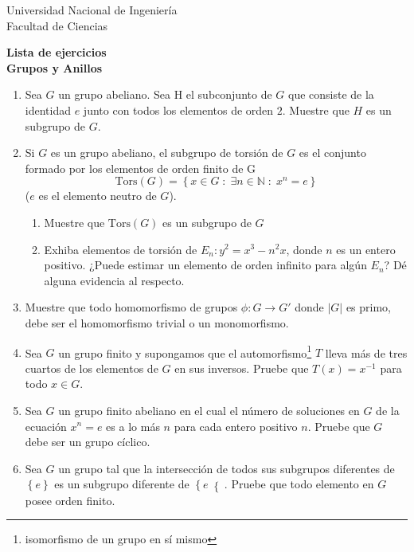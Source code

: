 \documentclass[12pt]{report}
\begin{document}
\begin{flushleft}
Universidad Nacional de Ingenier\'ia\\Facultad de Ciencias\\ \vspace{1cm}
\end{flushleft}
\begin{center}
\textbf{\Large{Lista de ejercicios\\ Grupos y Anillos}}
\end{center}
\begin{enumerate}
\item Sea $G$ un grupo abeliano. Sea H el subconjunto de $G$ que consiste de la identidad $e$ junto con todos los elementos de orden $2$. Muestre que $H$ es un subgrupo de $G$.
\item Si $G$ es un grupo abeliano, el subgrupo de torsi\'on de $G$ es el conjunto formado por los elementos de orden finito de G $$\text{Tors}(G)=\left\lbrace x\in G\;:\;\exists n\in\mathbb{N}\;:\; x^n=e\right\rbrace$$ 
($e$ es el elemento neutro de $G$).
\begin{enumerate}
\item Muestre que $\text{Tors}(G)$ es un subgrupo de $G$
\item Exhiba elementos de torsi\'on de $E_n:y^2=x^3-n^2x$, donde $n$ es un entero positivo. ¿Puede estimar un elemento de orden infinito para alg\'un $E_n$? D\'e alguna evidencia al respecto.
\end{enumerate}
\item Muestre que todo homomorfismo de grupos $\phi:G\rightarrow G'$ donde $|G|$ es primo, debe ser el homomorfismo trivial o un monomorfismo.
\item Sea $G$ un grupo finito y supongamos que el automorfismo\footnote{isomorfismo de un grupo en s\'i mismo} $T$ lleva m\'as de tres cuartos de los elementos de $G$ en sus inversos. Pruebe que $T(x)=x^{-1}$ para todo $x\in G$.
\item Sea $G$ un grupo finito abeliano en el cual el n\'umero de soluciones en $G$ de la ecuaci\'on $x^n=e$ es a lo m\'as $n$ para cada entero positivo $n$. Pruebe que $G$ debe ser un grupo c\'iclico.
\item Sea $G$ un grupo tal que la intersecci\'on de todos sus subgrupos diferentes de $\left\lbrace e\right\rbrace$ es un subgrupo diferente de $\left\lbrace e\right\lbrace$. Pruebe que todo elemento en $G$ posee orden finito.

\end{enumerate}
\end{document}
